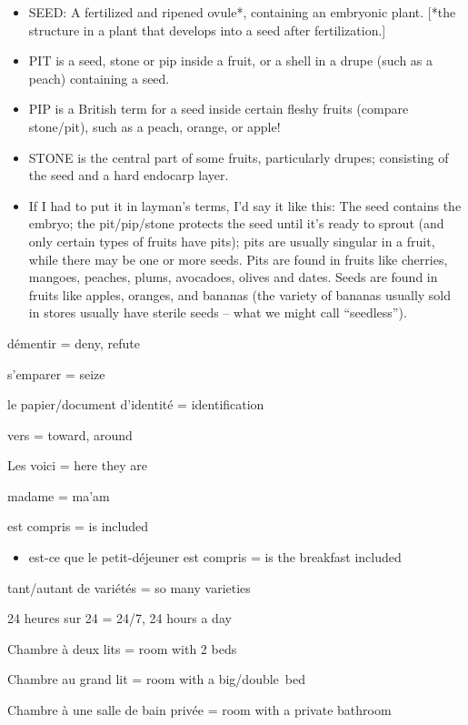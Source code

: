 \begin{itemize}
\item
  SEED: A fertilized and ripened ovule*, containing an embryonic plant.
  {[}*the structure in a plant that develops into a seed after
  fertilization.{]}
\item
  PIT is a seed, stone or pip inside a fruit, or a shell in a drupe
  (such as a peach) containing a seed.
\item
  PIP is a British term for a seed inside certain fleshy fruits (compare
  stone/pit), such as a peach, orange, or apple!
\item
  STONE is the central part of some fruits, particularly drupes;
  consisting of the seed and a hard endocarp layer.
\item
  If I had to put it in layman's terms, I'd say it like this: The seed
  contains the embryo; the pit/pip/stone protects the seed until it's
  ready to sprout (and only certain types of fruits have pits); pits are
  usually singular in a fruit, while there may be one or more seeds.
  Pits are found in fruits like cherries, mangoes, peaches, plums,
  avocadoes, olives and dates. Seeds are found in fruits like apples,
  oranges, and bananas (the variety of bananas usually sold in stores
  usually have sterile seeds -- what we might call ``seedless'').
\end{itemize}

démentir = deny, refute

s'emparer = seize

le papier/document d'identité = identification

vers = toward, around

Les voici = here they are

madame = ma'am

est compris = is included

\begin{itemize}
\item
  est-ce que le petit-déjeuner est compris = is the breakfast included
\end{itemize}

tant/autant de variétés = so many varieties

24 heures sur 24 = 24/7, 24 hours a day

Chambre à deux lits = room with 2 beds

Chambre au grand lit = room with a big/double~bed

Chambre à une salle de bain privée = room with a private bathroom~

